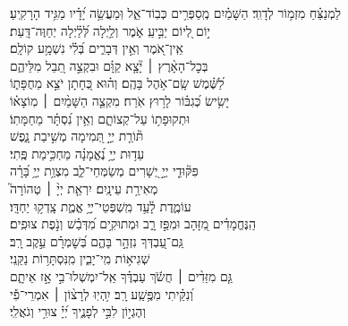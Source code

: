 \documentclass[twoside, openany, parskip=half, 11pt]{book}
\begin{document}
\begin{narrow}


לַמְנַצֵּ֗חַ מִזְמ֥וֹר לְדָוִֽד׃ \hfill \break
 הַשָּׁמַ֗יִם מְֽסַפְּרִ֥ים כְּבֽוֹד־אֵ֑ל \hfill וּֽמַעֲשֵׂ֥ה יָ֝דָ֗יו מַגִּ֥יד הָרָקִֽיעַ׃ \\
 י֣וֹם לְ֭יוֹם יַבִּ֣יעַֽ אֹ֑מֶר \hfill וְלַ֥יְלָה לְּ֝לַ֗יְלָה יְחַוֶּה־דָּֽעַת׃ \\
 אֵֽין־אֹ֭מֶר וְאֵ֣ין דְּבָרִ֑ים \hfill בְּ֝לִ֗י נִשְׁמָ֥ע קוֹלָֽם׃ \\
 בְּכׇל־הָאָ֨רֶץ ׀ יָ֘צָ֤א קַוָּ֗ם \hfill וּבִקְצֵ֣ה תֵ֭בֵל מִלֵּיהֶ֑ם \\
  לַ֝שֶּׁ֗מֶשׁ שָֽׂם־אֹ֥הֶל בָּהֶֽם׃ \hfill
 וְה֗וּא כְּ֭חָתָן יֹצֵ֣א מֵחֻפָּת֑וֹ\\
  יָשִׂ֥ישׂ כְּ֝גִבּ֗וֹר לָר֥וּץ אֹֽרַח׃ \hfill
 מִקְצֵ֤ה הַשָּׁמַ֨יִם ׀ מֽוֹצָא֗וֹ\\ וּתְקוּפָת֥וֹ עַל־קְצוֹתָ֑ם \hfill וְאֵ֥ין נִ֝סְתָּ֗ר מֵחַמָּתֽוֹ׃ \\
 תּ֘וֹרַ֤ת יְיָ֣ תְּ֭מִימָה \hfill מְשִׁ֣יבַת נָ֑פֶשׁ \\
  עֵד֥וּת יְיָ֥ נֶ֝אֱמָנָ֗ה \hfill מַחְכִּ֥ימַת פֶּֽתִי׃ \\
 פִּקּ֘וּדֵ֤י יְיָ֣ יְ֭שָׁרִים מְשַׂמְּחֵי־לֵ֑ב \hfill מִצְוַ֥ת יְיָ֥ בָּ֝רָ֗ה\\
  מְאִירַ֥ת עֵינָֽיִם׃ \hfill
 יִרְאַ֤ת יְיָ֨ ׀ טְהוֹרָה֮ \\
  עוֹמֶ֢דֶת לָ֫עַ֥ד \hfill מִֽשְׁפְּטֵי־יְיָ֥ אֱמֶ֑ת צָֽדְק֥וּ יַחְדָּֽו׃ \\
 הַֽנֶּחֱמָדִ֗ים מִ֭זָּהָב וּמִפַּ֣ז רָ֑ב \hfill וּמְתוּקִ֥ים מִ֝דְּבַ֗שׁ וְנֹ֣פֶת צוּפִֽים׃ \\
 גַּֽם־עַ֭בְדְּךָ נִזְהָ֣ר בָּהֶ֑ם \hfill בְּ֝שׇׁמְרָ֗ם עֵ֣קֶב רָֽב׃ \\
 שְׁגִיא֥וֹת מִֽי־יָבִ֑ין \hfill מִֽנִּסְתָּר֥וֹת נַקֵּֽנִי׃ \\
 גַּ֤ם מִזֵּדִ֨ים ׀ חֲשֹׂ֬ךְ עַבְדֶּ֗ךָ \hfill אַֽל־יִמְשְׁלוּ־בִ֣י אָ֣ז אֵיתָ֑ם \\
  וְ֝נִקֵּ֗יתִי מִפֶּ֥שַֽׁע רָֽב׃ \hfill
 יִ֥הְיֽוּ לְרָצ֨וֹן ׀ אִמְרֵי־פִ֡י\\
  וְהֶגְי֣וֹן לִבִּ֣י לְפָנֶ֑יךָ \hfill יְ֝יָ֗ צוּרִ֥י וְגֹאֲלִֽי׃ \\


\enlargethispage{\baselineskip}


\end{narrow}
\end{document}
